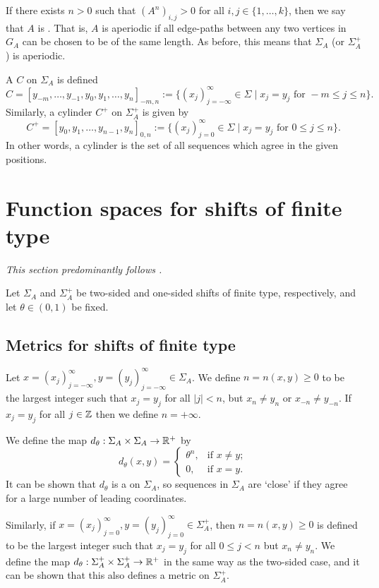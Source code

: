 If there exists $n > 0$ such that $(A^n)_{i, j} > 0$ for all $i, j \in \{1, \dots, k\}$, then we say that $A$ is . That is, $A$ is aperiodic if all edge-paths between any two vertices in $G_A$ can be chosen to be of the same length. As before, this means that $\Sigma_A$ (or $\Sigma_A^+$) is aperiodic.

A  $C$ on $\Sigma_A$ is defined
\[
	C = [y_{-m}, \dots, y_{-1}, y_0, y_1, \dots, y_n]_{-m, n} := \{(x_j)_{j = -\infty}^\infty \in \Sigma \mid x_j = y_j \text{ for } -m \leq j \leq n\}.
\]
Similarly, a cylinder $C^+$ on $\Sigma_A^+$ is given by
\[
	C^+ = [y_0, y_1, \dots, y_{n - 1}, y_n]_{0, n} := \{(x_j)_{j = 0}^\infty \in \Sigma \mid x_j = y_j \text{ for } 0 \leq j \leq n\}.
\]
In other words, a cylinder is the set of all sequences which agree in the given positions.

\section{Function spaces for shifts of finite type}
\emph{This section predominantly follows \cite[Chapter 1]{parry-pollicott:zeta-fns-periodic-orbits}.}

Let $\Sigma_A$ and $\Sigma_A^+$ be two-sided and one-sided shifts of finite type, respectively, and let $\theta \in (0, 1)$ be fixed.

\subsection{Metrics for shifts of finite type}
Let $x = (x_j)_{j = -\infty}^\infty, y = (y_j)_{j = -\infty}^\infty \in \Sigma_A$. We define $n = n(x, y) \geq 0$ to be the largest integer such that $x_j = y_j$ for all $|j| < n$, but $x_n \neq y_n$ or $x_{-n} \neq y_{-n}$. If $x_j = y_j$ for all $j \in \mathbb{Z}$ then we define $n = +\infty$.

We define the map $d_\theta : \Sigma_A \times \Sigma_A \to \mathbb{R}^+$ by
\[
	d_\theta(x, y) =
	\begin{cases}
		\theta^n, & \text{if } x \neq y; \\
		0, & \text{if } x = y.
	\end{cases}
\]
It can be shown that $d_\theta$ is a  on $\Sigma_A$, so sequences in $\Sigma_A$ are `close' if they agree for a large number of leading coordinates.

Similarly, if $x = (x_j)_{j = 0}^\infty, y = (y_j)_{j = 0}^\infty \in \Sigma_A^+$, then $n = n(x, y) \geq 0$ is defined to be the largest integer such that $x_j = y_j$ for all $0 \leq j < n$ but $x_n \neq y_n$. We define the map $d_\theta : \Sigma_A^+ \times \Sigma_A^+ \to \mathbb{R}^+$ in the same way as the two-sided case, and it can be shown that this also defines a metric on $\Sigma_A^+$.

